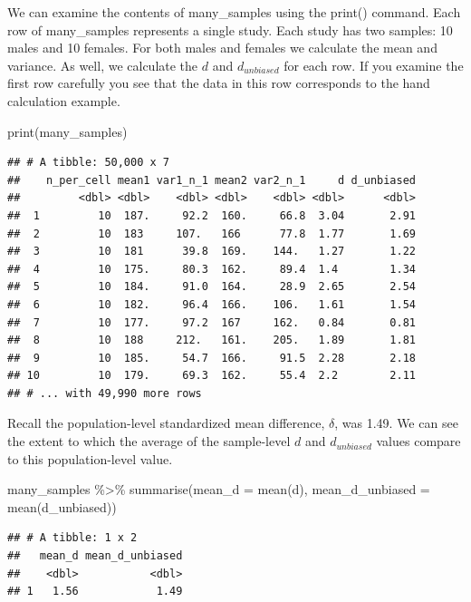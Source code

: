 \documentclass[
]{krantz}
\makeatletter
\newenvironment{Shaded}{\begin{snugshade}}{\end{snugshade}}
\newcommand{\AttributeTok}[1]{\textcolor[rgb]{0.61,0.61,0.61}{#1}}
\newcommand{\FunctionTok}[1]{\textcolor[rgb]{0,0,0}{#1}}
\newcommand{\NormalTok}[1]{#1}
\newcommand{\SpecialCharTok}[1]{\textcolor[rgb]{0,0,0}{#1}}
\newenvironment{kframe}{%
\medskip{}
\setlength{\fboxsep}{.8em}
 \def\at@end@of@kframe{}%
 \ifinner\ifhmode%
  \def\at@end@of@kframe{\end{minipage}}%
  \begin{minipage}{\columnwidth}%
 \fi\fi%
 \def\FrameCommand##1{\hskip\@totalleftmargin \hskip-\fboxsep
 \colorbox{shadecolor}{##1}\hskip-\fboxsep
     \hskip-\linewidth \hskip-\@totalleftmargin \hskip\columnwidth}%
 \MakeFramed {\advance\hsize-\width
   \@totalleftmargin\z@ \linewidth\hsize
   \@setminipage}}%
 {\par\unskip\endMakeFramed%
 \at@end@of@kframe}
\renewenvironment{Shaded}{\begin{kframe}}{\end{kframe}}
\makeatother
\begin{document}
We can examine the contents of many\_samples using the print() command. Each row of many\_samples represents a single study. Each study has two samples: 10 males and 10 females. For both males and females we calculate the mean and variance. As well, we calculate the \(d\) and \(d_{unbiased}\) for each row. If you examine the first row carefully you see that the data in this row corresponds to the hand calculation example.

\begin{Shaded}
\begin{Highlighting}[]
\FunctionTok{print}\NormalTok{(many\_samples)}
\end{Highlighting}
\end{Shaded}

\begin{verbatim}
## # A tibble: 50,000 x 7
##    n_per_cell mean1 var1_n_1 mean2 var2_n_1     d d_unbiased
##         <dbl> <dbl>    <dbl> <dbl>    <dbl> <dbl>      <dbl>
##  1         10  187.     92.2  160.     66.8  3.04       2.91
##  2         10  183     107.   166      77.8  1.77       1.69
##  3         10  181      39.8  169.    144.   1.27       1.22
##  4         10  175.     80.3  162.     89.4  1.4        1.34
##  5         10  184.     91.0  164.     28.9  2.65       2.54
##  6         10  182.     96.4  166.    106.   1.61       1.54
##  7         10  177.     97.2  167     162.   0.84       0.81
##  8         10  188     212.   161.    205.   1.89       1.81
##  9         10  185.     54.7  166.     91.5  2.28       2.18
## 10         10  179.     69.3  162.     55.4  2.2        2.11
## # ... with 49,990 more rows
\end{verbatim}

Recall the population-level standardized mean difference, \(\delta\), was 1.49. We can see the extent to which the average of the sample-level \(d\) and \(d_{unbiased}\) values compare to this population-level value.

\begin{Shaded}
\begin{Highlighting}[]
\NormalTok{many\_samples }\SpecialCharTok{\%\textgreater{}\%}
  \FunctionTok{summarise}\NormalTok{(}\AttributeTok{mean\_d =} \FunctionTok{mean}\NormalTok{(d),}
            \AttributeTok{mean\_d\_unbiased =} \FunctionTok{mean}\NormalTok{(d\_unbiased))}
\end{Highlighting}
\end{Shaded}

\begin{verbatim}
## # A tibble: 1 x 2
##   mean_d mean_d_unbiased
##    <dbl>           <dbl>
## 1   1.56            1.49
\end{verbatim}
\end{document}
